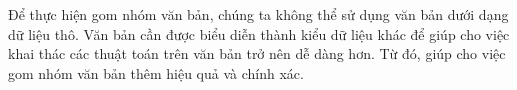 Để thực hiện gom nhóm văn bản, chúng ta không thể sử dụng văn bản dưới dạng dữ liệu thô.
Văn bản cần được biểu diễn thành kiểu dữ liệu khác để giúp cho việc khai thác các thuật toán trên văn bản trở nên dễ dàng hơn.
Từ đó, giúp cho việc gom nhóm văn bản thêm hiệu quả và chính xác.









